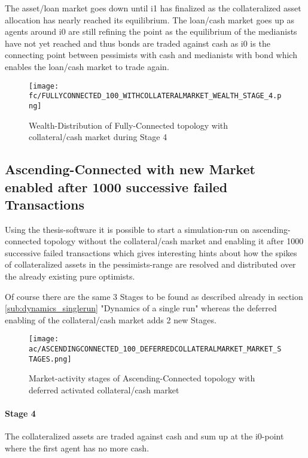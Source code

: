 \documentclass[Bachelorarbeit.tex]{subfiles}
\begin{document}
\medskip

The asset/loan market goes down until i1 has finalized as the collateralized asset allocation has nearly reached its equilibrium.
The loan/cash market goes up as agents around i0 are still refining the point as the equilibrium of the medianists have not yet reached and thus bonds are traded against cash as i0 is the connecting point between pessimists with cash and medianists with bond which enables the loan/cash market to trade again.

\begin{figure}[H]
	\centering
  \texttt{[image: fc/FULLYCONNECTED\_100\_WITHCOLLATERALMARKET\_WEALTH\_STAGE\_4.png]}
  	\caption{Wealth-Distribution of Fully-Connected topology with collateral/cash market during Stage 4}
	\label{fig:markets_FULLYCONNECTED_100_WITHCOLLATERALMARKET_WEALTH_STAGE_4}
\end{figure}

\subsection{Ascending-Connected with new Market enabled after 1000 successive failed Transactions}
Using the thesis-software it is possible to start a simulation-run on ascending-connected topology without the collateral/cash market and enabling it after 1000 successive failed transactions which gives interesting hints about how the spikes of collateralized assets in the pessimists-range are resolved and distributed over the already existing pure optimists.

\medskip

Of course there are the same 3 Stages to be found as described already in section \ref{sub:dynamics_singlerun} "Dynamics of a single run" whereas the deferred enabling of the collateral/cash market adds 2 new Stages.

\begin{figure}[H]
	\centering
  \texttt{[image: ac/ASCENDINGCONNECTED\_100\_DEFERREDCOLLATERALMARKET\_MARKET\_STAGES.png]}
  	\caption{Market-activity stages of Ascending-Connected topology with deferred activated collateral/cash market}
	\label{fig:markets_ASCENDINGCONNECTED_100_DEFERREDCOLLATERALMARKET_MARKET_STAGES}
\end{figure}

\paragraph{Stage 4}
The collateralized assets are traded against cash and sum up at the i0-point where the first agent has no more cash. 
\end{document}
